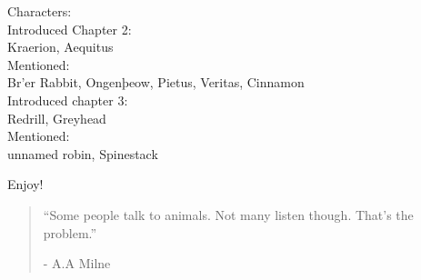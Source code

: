 \documentclass[smalldemyvopaper,11pt,twoside,onecolumn,openright,extrafontsizes]{memoir}
\begin{document}
Characters:\\[1cm]
Introduced Chapter 2:\\[0.1cm]
Kraerion,
Aequitus\\[0.1cm]
Mentioned:\\[0.1cm]
Br'er Rabbit,
Ongenþeow,
Pietus,
Veritas,
Cinnamon\\[1cm]

Introduced chapter 3:\\[0.1cm]
Redrill, Greyhead\\[0.1cm]
Mentioned:\\[0.1cm]
unnamed robin, Spinestack




Enjoy!



\clearpage
\tableofcontents*

\clearpage


	

\clearpage

\vspace*{4.3cm}
\begin{localsize}{10}
  \begin{quote}
    “Some people talk to animals. Not many listen though. That's the problem.”
    \begin{flushright}- A.A Milne \end{flushright}
  \end{quote} 
\end{localsize}
\vspace{1cm}
\end{document}

